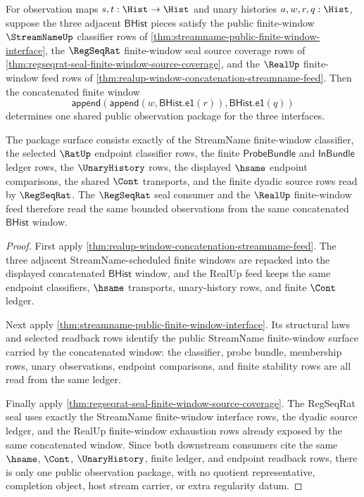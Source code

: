 \begin{theorem}
\label{thm:streamname-regseqrat-shared-window-cover}
For observation maps $s,t:\Hist\to\Hist$ and unary histories
$a,w,r,q:\Hist$, suppose the three adjacent $\mathsf{BHist}$ pieces satisfy the
public finite-window $\StreamNameUp$ classifier rows of
\autoref{thm:streamname-public-finite-window-interface}, the
$\RegSeqRat$ finite-window seal source coverage rows of
\autoref{thm:regseqrat-seal-finite-window-source-coverage}, and the
$\RealUp$ finite-window feed rows of
\autoref{thm:realup-window-concatenation-streamname-feed}. Then the
concatenated finite window
$$
\mathsf{append}(\mathsf{append}(w,\mathsf{BHist.e1}(r)),
\mathsf{BHist.e1}(q))
$$
determines one shared public observation package for the three interfaces.

The package surface consists exactly of the StreamName finite-window classifier,
the selected $\RatUp$ endpoint classifier rows, the finite
$\mathsf{ProbeBundle}$ and $\mathsf{InBundle}$ ledger rows, the
$\UnaryHistory$ rows, the displayed $\hsame$ endpoint comparisons, the shared
$\Cont$ transports, and the finite dyadic source rows read by $\RegSeqRat$.
The $\RegSeqRat$ seal consumer and the $\RealUp$ finite-window feed therefore
read the same bounded observations from the same concatenated
$\mathsf{BHist}$ window.
\end{theorem}
\begin{proof}
First apply
\autoref{thm:realup-window-concatenation-streamname-feed}. The three adjacent
StreamName-scheduled finite windows are repacked into the displayed
concatenated $\mathsf{BHist}$ window, and the RealUp feed keeps the same
endpoint classifiers, $\hsame$ transports, unary-history rows, and finite
$\Cont$ ledger.

Next apply \autoref{thm:streamname-public-finite-window-interface}. Its
structural laws and selected readback rows identify the public StreamName
finite-window surface carried by the concatenated window: the classifier, probe
bundle, membership rows, unary observations, endpoint comparisons, and finite
stability rows are all read from the same ledger.

Finally apply
\autoref{thm:regseqrat-seal-finite-window-source-coverage}. The RegSeqRat seal
uses exactly the StreamName finite-window interface rows, the dyadic source
ledger, and the RealUp finite-window exhaustion rows already exposed by the
same concatenated window. Since both downstream consumers cite the same
$\hsame$, $\Cont$, $\UnaryHistory$, finite ledger, and endpoint readback rows,
there is only one public observation package, with no quotient representative,
completion object, host stream carrier, or extra regularity datum.
\end{proof}

